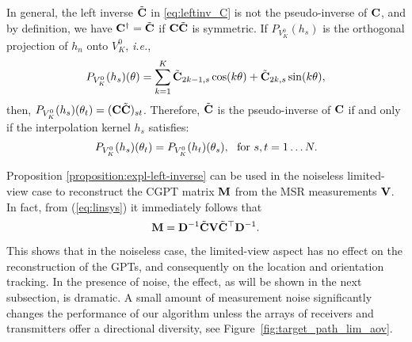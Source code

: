 \begin{rmk}
  In general, the left inverse $\tilde{\mathbf{C}}$ in \eqref{eq:leftinv_C} is not the pseudo-inverse of
  $\mathbf{C}$, and by definition, we have ${\mathbf{C}}^{\dagger}=\tilde{\mathbf{C}}$ if $\mathbf{C}\tilde{\mathbf{C}}$ is symmetric.
  If
  $P_{V_K^0}(h_s)$ is the orthogonal projection of $h_n$ onto
  $V_K^0$, {\it i.e.},
  \begin{align}
    \label{eq:hs_VK_proj}
    P_{V_K^0}(h_s)(\theta) = \sum_{k=1}^K  \tilde {\mathbf{C}}_{2k-1,s}\cos(k\theta) +  \tilde
    {\mathbf{C}}_{2k,s}\sin(k\theta),
  \end{align}
  then, $P_{V_K^0}(h_s)(\theta_t) = (\mathbf{C}\tilde {\mathbf{C}})_{st}$. Therefore, $\tilde{\mathbf{C}}$ is the pseudo-inverse of $\mathbf{C}$ if and only if the interpolation kernel $h_s$
satisfies:
  \begin{align}
    \label{eq:sampling_kernel_cond}
    P_{V_K^0}(h_s)(\theta_t) = P_{V_K^0}(h_t)(\theta_s), \ \text{ for } s,t=1\ldots
    N.
  \end{align}
\end{rmk}


\begin{remark} Proposition \ref{proposition:expl-left-inverse} can be used
in the noiseless limited-view case to reconstruct the CGPT matrix
$\mathbf{M}$ from the MSR measurements $\mathbf{V}$. In fact, from
(\ref{eq:linsys}) it immediately follows that
$$
  \mathbf{M} = \mathbf{D}^{-1} \tilde{\mathbf{C}} \mathbf{V} \tilde{\mathbf{C}}^\top \mathbf{D}^{-1}. $$
This shows that in the noiseless case, the limited-view aspect has
no effect on the reconstruction of the GPTs, and consequently on
the location and orientation tracking. In the presence of noise,
the effect, as will be shown in the next subsection, is dramatic.
A small amount of measurement noise significantly changes the
performance of our algorithm unless the arrays of receivers and
transmitters offer a directional diversity, see
Figure~\ref{fig:target_path_lim_aov}.
\end{remark}





